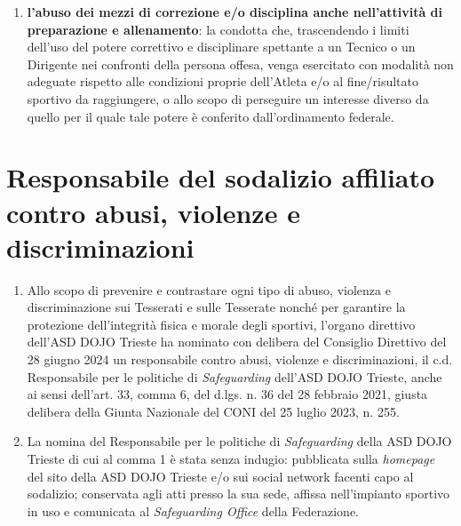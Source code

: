 \documentclass{djtsdoc}
\begin{document}
\begin{enumerate}
\begin{enumerate}
			\item \textbf{l'abuso dei mezzi di correzione e/o disciplina anche nell'attività di preparazione e allenamento}: la condotta che, trascendendo i limiti dell'uso del potere correttivo e disciplinare spettante a un Tecnico o un Dirigente nei confronti della persona offesa, venga esercitato con modalità non adeguate rispetto alle condizioni proprie dell'Atleta e/o al fine/risultato sportivo da raggiungere, o allo scopo di perseguire un interesse diverso da quello per il quale tale potere è conferito dall'ordinamento federale.
		\end{enumerate}
	\end{enumerate}
	
	\section{Responsabile del sodalizio affiliato contro abusi, violenze e discriminazioni}
	\begin{enumerate}
		\item Allo scopo di prevenire e contrastare ogni tipo di abuso, violenza e discriminazione sui Tesserati e sulle Tesserate nonché per garantire la protezione dell'integrità fisica e morale degli sportivi, l'organo direttivo dell'ASD DOJO Trieste ha nominato con delibera del Consiglio Direttivo del 28 giugno 2024 un responsabile contro abusi, violenze e discriminazioni, il c.d. Responsabile per le politiche di \textit{Safeguarding} dell'ASD DOJO Trieste, anche ai sensi dell'art. 33, comma 6, del d.lgs. n. 36 del 28 febbraio 2021, giusta delibera della Giunta Nazionale del CONI del 25 luglio 2023, n. 255.
		\item La nomina del Responsabile per le politiche di \textit{Safeguarding} della ASD DOJO Trieste di cui al comma 1 è stata senza indugio: pubblicata sulla \textit{homepage} del sito della ASD DOJO Trieste e/o sui social network facenti capo al sodalizio; conservata agli atti presso la sua sede, affissa nell'impianto sportivo in uso e comunicata al \textit{Safeguarding Office} della Federazione.
	\end{enumerate}
	
\end{document}
